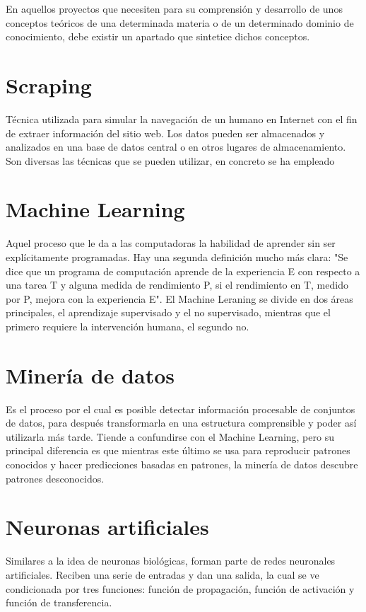 
En aquellos proyectos que necesiten para su comprensión y desarrollo de unos conceptos teóricos de una determinada materia o de un determinado dominio de conocimiento, debe existir un apartado que sintetice dichos conceptos.


\section{Scraping}
Técnica utilizada para simular  la navegación de un humano en Internet con el fin de extraer información del sitio web. Los datos pueden ser almacenados y analizados en una base de datos central o en otros lugares de almacenamiento.  Son diversas las técnicas que se pueden utilizar, en concreto se ha empleado\cite{_web_2016}

\section{Machine Learning}
Aquel proceso que le da a las computadoras la habilidad de aprender sin ser explícitamente programadas. Hay una segunda definición mucho más clara: "Se dice que un programa de computación aprende de la experiencia E con respecto a una tarea T y alguna medida de rendimiento P, si el rendimiento en T, medido por P, mejora con la experiencia E". 
El Machine Leraning se divide en dos áreas principales, el aprendizaje supervisado y el no supervisado, mientras que el primero requiere la intervención humana, el segundo no.\cite{_machine_learning_2014}

\section{Minería de datos} Es el proceso por el cual es posible detectar información procesable de conjuntos de datos, para después transformarla en una estructura comprensible y poder así utilizarla más tarde.
Tiende a confundirse con el Machine Learning, pero su principal diferencia es que mientras este último se usa para reproducir patrones conocidos y hacer predicciones basadas en patrones, la minería de datos descubre patrones desconocidos.
\section{Neuronas artificiales}
Similares a la idea de neuronas biológicas, forman parte de redes neuronales artificiales. Reciben una serie de entradas y dan una salida, la cual se ve condicionada por tres funciones: función de propagación, función de activación y función de transferencia.\cite{_servidor_2016}

